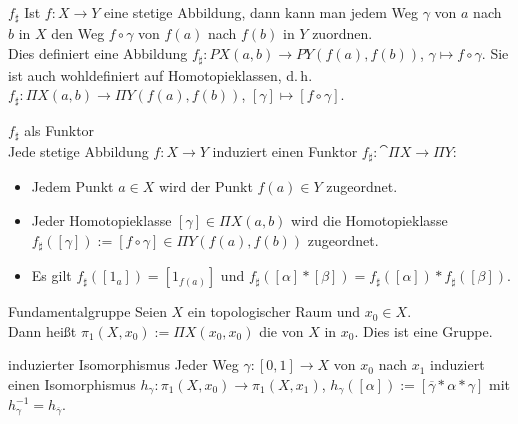 \linie

\begin{Def}{$f_\sharp$}
    Ist $f\colon X \rightarrow Y$ eine stetige Abbildung, dann kann
    man jedem Weg $\gamma$ von $a$ nach $b$ in $X$
    den Weg $f \circ \gamma$ von $f(a)$ nach $f(b)$ in $Y$ zuordnen. \\
    Dies definiert eine Abbildung
    $f_\sharp\colon PX(a, b) \rightarrow PY(f(a), f(b))$,
    $\gamma \mapsto f \circ \gamma$.
    Sie ist auch wohldefiniert auf Homotopieklassen, d.\,h.
    $f_\sharp\colon \Pi X(a, b) \rightarrow \Pi Y(f(a), f(b))$,
    $[\gamma] \mapsto [f \circ \gamma]$.
\end{Def}

\begin{Satz}{$f_\sharp$ als Funktor}\\
    Jede stetige Abbildung $f\colon X \rightarrow Y$ induziert einen Funktor
    $f_\sharp\colon \cat{\Pi X} \rightarrow \Pi Y$:
    \begin{itemize}
        \item
        Jedem Punkt $a \in X$ wird der Punkt $f(a) \in Y$ zugeordnet.

        \item
        Jeder Homotopieklasse $[\gamma] \in \Pi X(a, b)$ wird die
        Homotopieklasse \\
        $f_\sharp([\gamma]) := [f \circ \gamma] \in \Pi Y(f(a), f(b))$
        zugeordnet.

        \item
        Es gilt $f_\sharp([1_a]) = [1_{f(a)}]$ und
        $f_\sharp([\alpha] \ast [\beta]) =
        f_\sharp([\alpha]) \ast f_\sharp([\beta])$.
    \end{itemize}
\end{Satz}

\linie

\begin{Def}{Fundamentalgruppe}
    Seien $X$ ein topologischer Raum und $x_0 \in X$. \\
    Dann heißt $\pi_1(X, x_0) := \Pi X(x_0, x_0)$
    die  von $X$ in $x_0$.
    Dies ist eine Gruppe.
\end{Def}

\begin{Satz}{induzierter Isomorphismus}
    Jeder Weg $\gamma\colon [0, 1] \rightarrow X$ von $x_0$ nach $x_1$
    induziert einen Isomorphismus
    $h_\gamma\colon \pi_1(X, x_0) \rightarrow \pi_1(X, x_1)$,
    $h_\gamma([\alpha]) := [\overline{\gamma} \ast \alpha \ast \gamma]$
    mit $h_\gamma^{-1} = h_{\overline{\gamma}}$.
\end{Satz}

